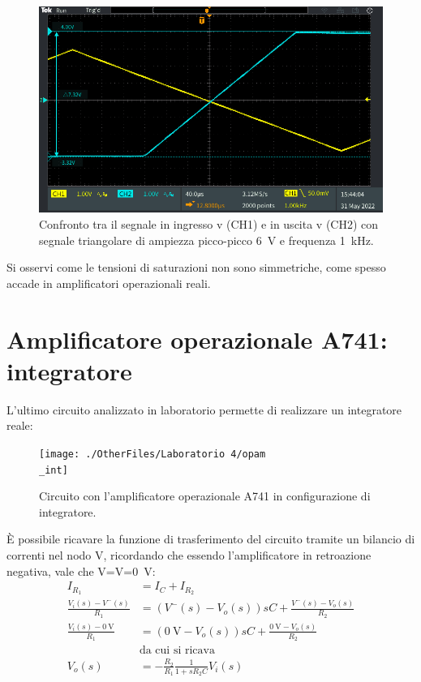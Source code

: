 \begin{figure}[h!]
	\centering
	\includegraphics[width=0.7\linewidth]{./ImageFiles/Laboratorio 4/TEK00015}
	\caption{Confronto tra il segnale in ingresso v (CH1)  e in uscita v (CH2) con segnale triangolare di ampiezza picco-picco \SI{6}{\volt} e frequenza \SI{1}{\kilo\hertz}.}
	\label{fig:opamp_inv_sat_tri}
\end{figure}

\noindent
Si osservi come le tensioni di saturazioni non sono simmetriche, come spesso accade in amplificatori operazionali reali.

\clearpage
\section{Amplificatore operazionale \textmu A741: integratore}

L'ultimo circuito analizzato in laboratorio permette di realizzare un integratore reale:
\begin{figure}[h!]
	\centering
	\texttt{[image: ./OtherFiles/Laboratorio 4/opam\\\_int]}
	\caption{Circuito con l'amplificatore operazionale \textmu A741 in configurazione di integratore.}
	\label{fig:opamp_int}
\end{figure}

\noindent
\`E possibile ricavare la funzione di trasferimento del circuito tramite un bilancio di correnti nel nodo V\super{-}, ricordando che essendo l'amplificatore in retroazione negativa, vale che V\super{+}=V\super{-}=\SI{0}{\volt}:
\begin{equation}
	\begin{split}
		I_{R_1}&=I_{C}+I_{R_2} \\
		\frac{V_i(s)-V^-(s)}{R_1}&=(V^-(s)-V_o(s))sC+\frac{V^-(s)-V_o(s)}{R_2} \\
		\frac{V_i(s)-\SI{0}{\volt}}{R_1}&=(\SI{0}{\volt}-V_o(s))sC+\frac{\SI{0}{\volt}-V_o(s)}{R_2} \\
		&\text{da cui si ricava} \\
		V_o(s)&=-\frac{R_2}{R_1}\frac{1}{1+sR_2C}V_i(s)
	\end{split}
\end{equation}

